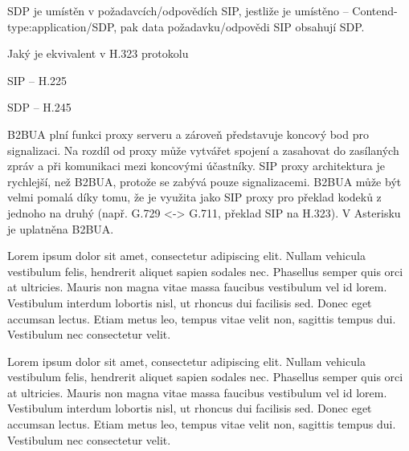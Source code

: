 SDP je umístěn v požadavcích/odpovědích SIP, jestliže je umístěno -- Contend-type:application/SDP, pak data požadavku/odpovědi SIP obsahují SDP.

Jaký je ekvivalent v H.323 protokolu

SIP -- H.225

SDP -- H.245


B2BUA plní funkci proxy serveru a zároveň představuje koncový bod pro signalizaci. Na rozdíl od proxy může vytvářet spojení a zasahovat do zasílaných zpráv a při komunikaci mezi koncovými účastníky. SIP proxy architektura je rychlejší, než B2BUA, protože se zabývá pouze signalizacemi. B2BUA může být velmi pomalá díky tomu, že je využita jako SIP proxy pro překlad kodeků z jednoho na druhý (např. G.729 <-> G.711, překlad SIP na H.323). V Asterisku je uplatněna B2BUA.


Lorem ipsum dolor sit amet, consectetur adipiscing elit. Nullam vehicula vestibulum felis, hendrerit aliquet sapien sodales nec. Phasellus semper quis orci at ultricies. Mauris non magna vitae massa faucibus vestibulum vel id lorem. Vestibulum interdum lobortis nisl, ut rhoncus dui facilisis sed. Donec eget accumsan lectus. Etiam metus leo, tempus vitae velit non, sagittis tempus dui. Vestibulum nec consectetur velit.


Lorem ipsum dolor sit amet, consectetur adipiscing elit. Nullam vehicula vestibulum felis, hendrerit aliquet sapien sodales nec. Phasellus semper quis orci at ultricies. Mauris non magna vitae massa faucibus vestibulum vel id lorem. Vestibulum interdum lobortis nisl, ut rhoncus dui facilisis sed. Donec eget accumsan lectus. Etiam metus leo, tempus vitae velit non, sagittis tempus dui. Vestibulum nec consectetur velit.


